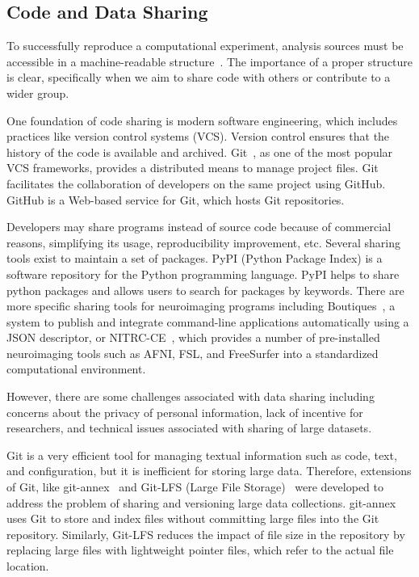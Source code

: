 \subsection{Code and Data Sharing}

To successfully reproduce a computational experiment, analysis sources 
must be accessible in a machine-readable 
structure~\cite{stodden2016enhancing,hasham2018cloud}. The importance 
of a proper structure is clear, specifically when we aim to share 
code with others or contribute to a wider group.

One foundation of code sharing is modern software engineering, which 
includes practices like version control systems (VCS). Version control 
ensures that the history of the code is available and archived. 
Git~\cite{git}, as one of the most popular VCS frameworks, provides a 
distributed means to manage project files. Git facilitates the 
collaboration of developers on the same project using GitHub. GitHub is 
a Web-based service for Git, which hosts Git repositories. 

Developers may share programs instead of source code 
because of commercial reasons, simplifying its usage, reproducibility improvement, 
etc. Several sharing tools exist to maintain a set 
of packages. PyPI (Python 
Package Index) is a software repository for the Python programming 
language. PyPI helps to share python packages and allows users to 
search for packages by keywords. There are more specific 
sharing tools for neuroimaging programs including 
Boutiques~\cite{glatard2018boutiques}, a system to publish and 
integrate command-line applications automatically using a JSON 
descriptor, or 
NITRC-CE~\cite{kennedy2016nitrc}, which provides a number of 
pre-installed neuroimaging tools such as AFNI, FSL, and FreeSurfer into 
a standardized computational environment. 

However, there are some challenges 
associated with data sharing including concerns about the privacy of 
personal information, lack of incentive for researchers, and 
technical issues associated with sharing of large datasets. 

Git is a very efficient tool for managing textual information such as 
code, text, and configuration, but it is inefficient for storing large 
data. Therefore, extensions of Git, like git-annex~\cite{git-annex} 
and Git-LFS (Large File Storage)~\cite{git-lfs} were developed to 
address the problem of sharing and versioning large data collections. 
git-annex uses Git to store and index files without committing large 
files into the Git repository. Similarly, Git-LFS reduces the impact of 
file size in the repository by replacing large files with lightweight 
pointer files, which refer to the actual file location. 

